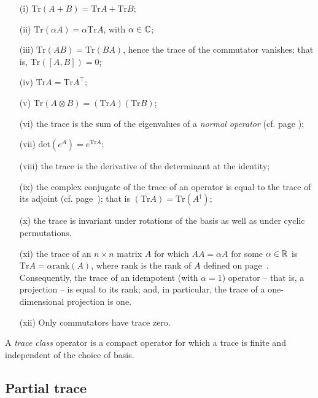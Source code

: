 \begin{itemize}
\item[(i)]
$\textrm{Tr}(A+B)=\textrm{Tr}A+\textrm{Tr}B$;
\item[(ii)]
$\textrm{Tr}(\alpha A)= \alpha \textrm{Tr}A$, with $\alpha \in {\Bbb C}$;
\item[(iii)]
$\textrm{Tr}(AB) = \textrm{Tr}(BA)$, hence the trace of the  commutator vanishes; that
is, $\textrm{Tr}([A,B])=0$;
\item[(iv)]
$\textrm{Tr}A = \textrm{Tr}A^\intercal $;
\item[(v)]
$\textrm{Tr}(A\otimes B)= (\textrm{Tr}A) (\textrm{Tr}B)$;
\item[(vi)]
the trace is the sum of the eigenvalues of a {\em normal operator} (cf. page \pageref{2014-m-fdvs-normality});
\item[(vii)]
$ \textrm{det}(e^A)=e^{\textrm{Tr}A} $;
\item[(viii)]
 the trace is the derivative of the determinant at the identity;
\item[(ix)]
the complex conjugate of the trace of an operator is equal to the trace of its adjoint
(cf. page~\pageref{2014-m-fdvs-adjoint}); that is
$\overline{(  \textrm{Tr} A)}=\textrm{Tr} (A^\dagger)$;
\item[(x)]
the trace is invariant under rotations of the basis as well as
under cyclic permutations.
\item[(xi)]
the trace of an $n \times n$ matrix $A$ for which $AA=\alpha A$ for some $\alpha \in {\Bbb R}$ is
$ \textrm{Tr} A =
\alpha \textrm{rank}(A)$,
where  $\textrm{rank}$ is the rank of $A$ defined on page~\pageref{2014-m-fdvs-rank}.
Consequently, the trace of an idempotent (with $\alpha=1$) operator -- that is, a projection --
is equal to its rank;
and, in particular, the trace of a one-dimensional projection is one.
\item[(xii)]
Only commutators have trace zero.
\end{itemize}


A {\em trace class} operator is a compact operator for which a trace is finite and independent of the choice of basis.

\subsection{Partial trace}
\label{2015-partialtrace}

